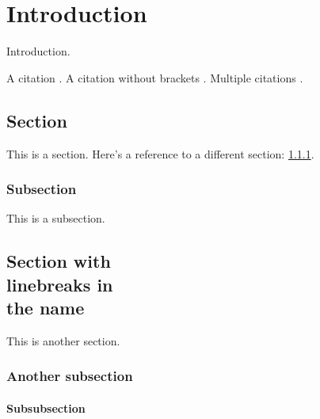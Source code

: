 \chapter{Introduction}
\label{sec:intro}

Introduction.

A citation \cite{A}. 
A citation without brackets . 
Multiple citations \cite{A, B, C}.

\section{Section}
\label{sec:section}

This is a section.  Here's a reference to a different section:
\ref{sec:subsection}.

\subsection{Subsection}
\label{sec:subsection}

This is a subsection.

% 

\section[Optional table of contents heading]{Section with\\linebreaks in\\the
name}

This is another section.

\subsection{Another subsection}

\subsubsection{Subsubsection}

